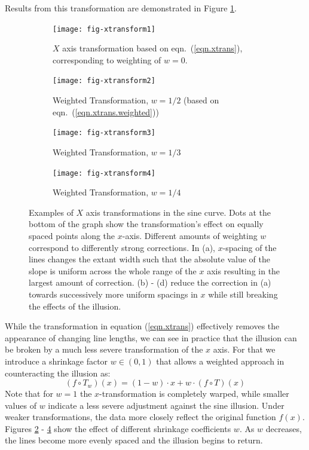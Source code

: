 \documentclass[11pt]{isuthesis}\usepackage[]{graphicx}\usepackage[]{color}
\begin{document}
Results from this transformation are demonstrated in Figure \ref{fig:xtrans1}.
 


\begin{figure}[h!tbp]\centering
\begin{subfigure}[b]{.45\linewidth}\centering 
\texttt{[image: fig-xtransform1]}
\caption[$X$ axis transformation]{$X$ axis transformation based on eqn.~(\ref{eqn.xtrans}), corresponding to weighting of $w=0$.}
\label{fig:xtrans1}
\end{subfigure} \hfill\hfill
\begin{subfigure}[b]{.45\linewidth}\centering
\texttt{[image: fig-xtransform2]} 
\caption[Weighted transformation]{Weighted Transformation, $w=1/2$ (based on eqn.~(\ref{eqn.xtrans.weighted}))}
\label{fig:xtrans2}
\end{subfigure}

\begin{subfigure}[b]{.45\linewidth}\centering 
\texttt{[image: fig-xtransform3]}
\caption[Weighted transformation]{Weighted Transformation, $w=1/3$}
\label{fig:xtrans3}
\end{subfigure} \hfill
\begin{subfigure}[b]{.45\linewidth}\centering
\texttt{[image: fig-xtransform4]}
\caption[Weighted transformation]{Weighted Transformation, $w=1/4$}
\label{fig:xtrans4}
\end{subfigure}
\caption[X axis transformations]{Examples of $X$ axis transformations in the sine curve.  Dots at the bottom of the graph show the transformation's effect on equally spaced points along the $x$-axis. Different amounts of weighting $w$ correspond to differently strong corrections. In (a),   $x$-spacing of the lines changes the extant width such that the absolute value of the slope is uniform across the whole range of the $x$ axis resulting in the largest amount of correction.  (b) - (d) reduce the correction in (a) towards successively more uniform spacings in $x$ while still breaking the effects of the illusion.}
\label{fig:xtrans}
\end{figure}
While the transformation in equation (\ref{eqn.xtrans}) effectively removes the appearance of changing line lengths, we can see in practice that the illusion can be broken by a much less severe transformation of the $x$ axis. 
For that we introduce a shrinkage factor $w \in (0,1)$ that allows a weighted approach in counteracting the illusion as: 
%
\begin{equation}\label{eqn.xtrans.weighted}
(f \circ T_w)(x) = (1-w) \cdot x + w \cdot (f \circ T)(x)
\end{equation}
%
Note that for $w=1$ the $x$-transformation is completely warped, while smaller values of $w$ indicate a less severe adjustment against the sine illusion.  Under  weaker transformations, the data more closely reflect the original function $f(x)$. 
Figures \ref{fig:xtrans2} - \ref{fig:xtrans4} show the effect of different shrinkage coefficients $w$. As $w$ decreases, the lines become more evenly spaced and the illusion begins to return. 
\end{document}
